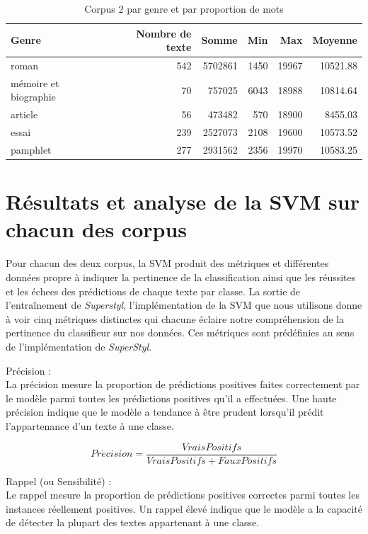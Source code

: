\begin{table}[H]
    \centering
    \begin{tabular}{lrrrrr}
    \toprule
    Genre & Nombre de texte & Somme & Min & Max & Moyenne  \\
    \toprule
    \midrule
    roman & 542 & 5702861 & 1450 & 19967 & 10521.88 \\
    \midrule
    mémoire et biographie & 70 & 757025 & 6043 & 18988 & 10814.64 \\
    \midrule
    article & 56 & 473482 & 570 & 18900 & 8455.03 \\
    \midrule
    essai & 239 & 2527073 & 2108 & 19600 & 10573.52 \\
    \midrule
    pamphlet & 277 & 2931562 & 2356 & 19970 & 10583.25 \\
    \bottomrule
    \end{tabular}
    \caption{Corpus 2 par genre et par proportion de mots}
    \label{'tab:corpus-echantillon-word'}
\end{table}

\section{Résultats et analyse de la SVM sur chacun des corpus}

Pour chacun des deux corpus, la SVM produit des métriques et différentes données propre à indiquer la pertinence de la classification ainsi que les réussites et les échecs des prédictions de chaque texte par classe. La sortie de l'entraînement de \textit{Superstyl}, l'implémentation de la SVM que nous utilisons donne à voir cinq métriques distinctes qui chacune éclaire notre compréhension de la pertinence du classifieur sur nos données. Ces métriques sont prédéfinies au sens de l'implémentation de \textit{SuperStyl}.

Précision :\\
La précision mesure la proportion de prédictions positives faites correctement par le modèle parmi toutes les prédictions positives qu'il a effectuées. Une haute précision indique que le modèle a tendance à être prudent lorsqu'il prédit l'appartenance d'un texte à une classe.

\begin{equation}
Pr\acute{e}cision = \frac{Vrais Positifs}{Vrais Positifs + Faux Positifs}
\end{equation}

Rappel (ou Sensibilité) :\\
Le rappel mesure la proportion de prédictions positives correctes parmi toutes les instances réellement positives. Un rappel élevé indique que le modèle a la capacité de détecter la plupart des textes appartenant à une classe.

